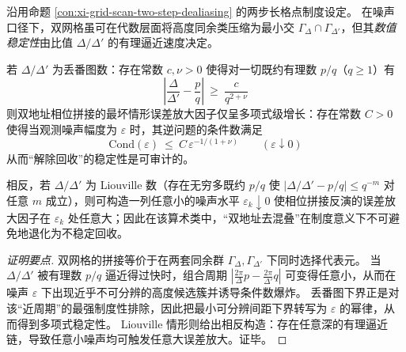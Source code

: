 \begin{proposition}\label{prop:xi-grid-scan-diophantine-dealiasing-stability}
沿用命题 \ref{con:xi-grid-scan-two-step-dealiasing} 的两步长格点制度设定。
在噪声口径下，双网格虽可在代数层面将高度同余类压缩为最小交 \(\Gamma_\Delta\cap\Gamma_{\Delta'}\)，但其\emph{数值稳定性}由比值 \(\Delta/\Delta'\) 的有理逼近速度决定。
\par
若 \(\Delta/\Delta'\) 为丢番图数：存在常数 \(c,\nu>0\) 使得对一切既约有理数 \(p/q\)（\(q\ge 1\)）有
\[
\boxed{\;
\left|\frac{\Delta}{\Delta'}-\frac{p}{q}\right|\ \ge\ \frac{c}{q^{2+\nu}}\;}
\]
则双地址相位拼接的最坏情形误差放大因子仅呈多项式级增长：存在常数 \(C>0\) 使得当观测噪声幅度为 \(\varepsilon\) 时，其逆问题的条件数满足
\[
\boxed{\;
\mathrm{Cond}(\varepsilon)\ \le\ C\,\varepsilon^{-1/(1+\nu)}\qquad(\varepsilon\downarrow 0)\;}
\]
从而“解除回收”的稳定性是可审计的。
\par
相反，若 \(\Delta/\Delta'\) 为 Liouville 数（存在无穷多既约 \(p/q\) 使 \(|\Delta/\Delta'-p/q|\le q^{-m}\) 对任意 \(m\) 成立），则可构造一列任意小的噪声水平 \(\varepsilon_k\downarrow 0\) 使相位拼接反演的误差放大因子在 \(\varepsilon_k\) 处任意大；因此在该算术类中，“双地址去混叠”在制度意义下不可避免地退化为不稳定回收。
\end{proposition}
\begin{proof}[证明要点]
双网格的拼接等价于在两套同余群 \(\Gamma_\Delta,\Gamma_{\Delta'}\) 下同时选择代表元。
当 \(\Delta/\Delta'\) 被有理数 \(p/q\) 逼近得过快时，组合周期
\(
\left|\frac{2\pi}{\Delta}p-\frac{2\pi}{\Delta'}q\right|
\)
可变得任意小，从而在噪声 \(\varepsilon\) 下出现近乎不可分辨的高度候选簇并诱导条件数爆炸。
丢番图下界正是对该“近周期”的最强制度性排除，因此把最小可分辨间距下界转写为 \(\varepsilon\) 的幂律，从而得到多项式稳定性。
Liouville 情形则给出相反构造：存在任意深的有理逼近链，导致任意小噪声均可触发任意大误差放大。证毕。
\end{proof}

\endinput
